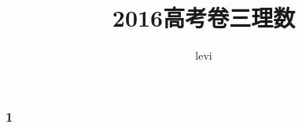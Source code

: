\documentclass{ctexbeamer}
\title{2016高考卷三理数}
\author{levi}
\institute{zcaxer}
\begin{document}
\frame{\titlepage}

\begin{frame}
\frametitle{1}

\end{frame}
\end{document}
